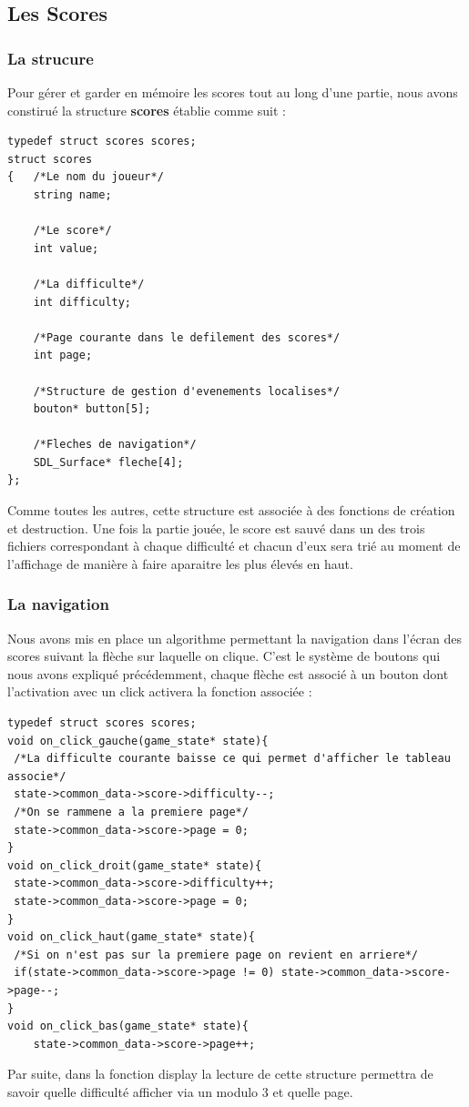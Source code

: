 \subsection{Les Scores}
\subsubsection{La strucure}
Pour gérer et garder en mémoire les scores tout au long d'une partie, nous avons constirué la structure \textbf{scores} établie comme suit :
\begin{lstlisting}
typedef struct scores scores;
struct scores
{	/*Le nom du joueur*/
	string name;
	
	/*Le score*/	
	int value;
		
	/*La difficulte*/
	int difficulty; 

	/*Page courante dans le defilement des scores*/
	int page;

	/*Structure de gestion d'evenements localises*/
	bouton* button[5];

	/*Fleches de navigation*/
	SDL_Surface* fleche[4];
}; 
\end{lstlisting} 
Comme toutes les autres, cette structure est associée à des fonctions de création et destruction. Une fois la partie jouée, le score est sauvé dans un des trois fichiers correspondant à chaque difficulté et chacun d'eux sera trié au moment de l'affichage de manière à faire aparaitre les plus élevés en haut.
\subsubsection{La navigation}
Nous avons mis en place un algorithme permettant la navigation dans l'écran des scores suivant la flèche sur laquelle on clique. 
C'est le système de boutons qui nous avons expliqué précédemment, chaque flèche est associé à un bouton dont l'activation avec un click activera la fonction associée : 
\begin{lstlisting}
typedef struct scores scores;
void on_click_gauche(game_state* state){
 /*La difficulte courante baisse ce qui permet d'afficher le tableau associe*/
 state->common_data->score->difficulty--;
 /*On se rammene a la premiere page*/
 state->common_data->score->page = 0;
}
void on_click_droit(game_state* state){
 state->common_data->score->difficulty++;
 state->common_data->score->page = 0;
}
void on_click_haut(game_state* state){
 /*Si on n'est pas sur la premiere page on revient en arriere*/
 if(state->common_data->score->page != 0) state->common_data->score->page--;
}
void on_click_bas(game_state* state){
	state->common_data->score->page++;
\end{lstlisting}
Par suite, dans la fonction display la lecture de cette structure permettra de savoir quelle difficulté afficher via un modulo 3 et quelle page.
